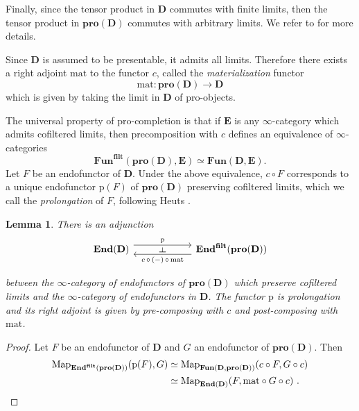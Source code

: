 \documentclass[a4paper,12pt]{amsart}
\theoremstyle{plain}
\newtheorem{lemma}[theorem]{Lemma}%
\theoremstyle{definition}
\theoremstyle{remark}
\begin{document}

Finally, since the tensor product in $\mathbf{D}$ commutes with finite limits, then the tensor product in $\mathbf{pro}(\mathbf{D})$ commutes with arbitrary limits. We refer to \cite[Section 5]{bachmann2024} for more details.


Since $\mathbf{D}$ is assumed to be presentable, it admits all limits. Therefore there exists a right adjoint $\mathrm{mat}$ to the functor $c$, called the \textit{materialization} functor
\[
\mathrm{mat}: \mathbf{pro}(\mathbf{D}) \longrightarrow \mathbf{D}
\] 
which is given by taking the limit in $\mathbf{D}$ of pro-objects. 

	The universal property of pro-completion is that if $\mathbf E$ is any  $\infty$-category which admits cofiltered limits, then precomposition with $c$ defines an equivalence of $\infty$-categories
	\[ \mathbf{Fun}^{\mathbf{filt}}(\mathbf{pro}(\mathbf D),\mathbf E) \simeq \mathbf{Fun}(\mathbf D,\mathbf E).\]
	Let $F$ be an endofunctor of $\mathbf D$. Under the above equivalence, $c \circ F$ corresponds to a unique endo\-functor $\mathrm p (F)$ of $\mathbf{pro}(\mathbf{D})$ preserving cofiltered limits, which we call the \emph{prolongation} of $F$, following Heuts \cite[Appendix A]{heuts2024}. 

\begin{lemma}
There is an adjunction 
\[
\begin{tikzcd}[column sep=5pc,row sep=3pc]
            \mathbf{End}(\mathbf{D})\arrow[r,"\mathrm{p}"{name=F},shift left=1.1ex ] &\mathbf{End}^{\mathbf{filt}}(\mathbf{pro}(\mathbf{D})) \arrow[l,"c \,\circ \,(-)\, \circ\, \mathrm{mat}"{name=U},shift left=1.1ex ]
            \arrow[phantom, from=F, to=U, , "\dashv" rotate=-90]
\end{tikzcd}
\]

between the $\infty$-category of endofunctors of $\mathbf{pro}(\mathbf{D})$ which preserve cofiltered limits and the $\infty$-category of endofunctors in $\mathbf{D}$. The functor $\mathrm{p}$ is prolongation and its right adjoint is given by pre-composing with $c$ and post-composing with $\mathrm{mat}$. 
\end{lemma} 

\begin{proof}
Let $F$ be an endofunctor of $\mathbf{D}$ and $G$ an endofunctor of $\mathbf{pro}(\mathbf{D})$. Then
\begin{align*}
\mathrm{Map}_{\mathbf{End}^{\mathbf{filt}}(\mathbf{pro}(\mathbf{D}))}(\mathrm{p}(F),G) &\simeq \mathrm{Map}_{\mathbf{Fun}(\mathbf{D},\mathbf{pro}(\mathbf{D}))}(c \circ F ,G \circ c) \\
&\simeq \mathrm{Map}_{\mathbf{End}(\mathbf{D})}(F,\mathrm{mat} \circ G \circ c)~. \qedhere
\end{align*} 
\end{proof}
\end{document}
